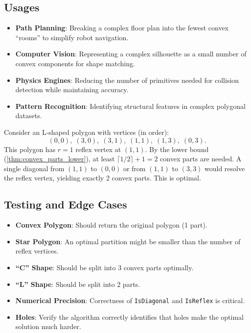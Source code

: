 \subsection{Usages}

\begin{itemize}
\item \textbf{Path Planning}: Breaking a complex floor plan into the fewest convex ``rooms'' to simplify robot navigation.
\item \textbf{Computer Vision}: Representing a complex silhouette as a small number of convex components for shape matching.
\item \textbf{Physics Engines}: Reducing the number of primitives needed for collision detection while maintaining accuracy.
\item \textbf{Pattern Recognition}: Identifying structural features in complex polygonal datasets.
\end{itemize}

\begin{example}\label{ex:l_shape_partition}
Consider an L-shaped polygon with vertices (in order):
\[
(0,0),\; (3,0),\; (3,1),\; (1,1),\; (1,3),\; (0,3).
\]
This polygon has $r = 1$ reflex vertex at $(1,1)$. By the lower bound (\cref{thm:convex_parts_lower}), at least $\lceil 1/2\rceil + 1 = 2$ convex parts are needed. A single diagonal from $(1,1)$ to $(0,0)$ or from $(1,1)$ to $(3,3)$ would resolve the reflex vertex, yielding exactly 2 convex parts. This is optimal.
\end{example}

\subsection{Testing and Edge Cases}

\begin{itemize}
\item \textbf{Convex Polygon}: Should return the original polygon (1 part).
\item \textbf{Star Polygon}: An optimal partition might be smaller than the number of reflex vertices.
\item \textbf{``C'' Shape}: Should be split into 3 convex parts optimally.
\item \textbf{``L'' Shape}: Should be split into 2 parts.
\item \textbf{Numerical Precision}: Correctness of \texttt{IsDiagonal} and \texttt{IsReflex} is critical.
\item \textbf{Holes}: Verify the algorithm correctly identifies that holes make the optimal solution much harder.
\end{itemize}

